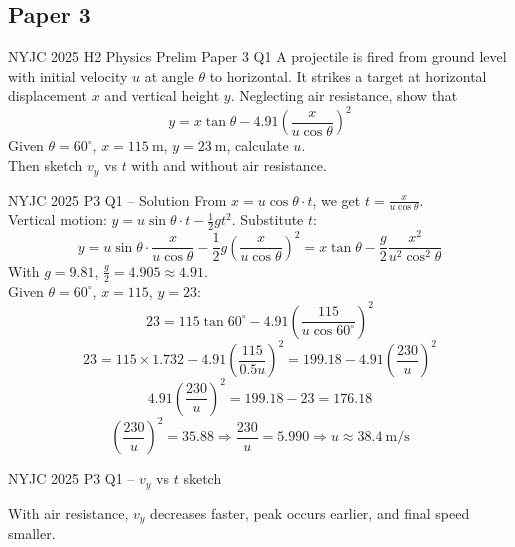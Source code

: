 \documentclass{beamer}
\begin{document}
\subsection{Paper 3}

\begin{frame}[t,shrink=15]{NYJC 2025 H2 Physics Prelim Paper 3 Q1}
A projectile is fired from ground level with initial velocity $u$ at angle $\theta$ to horizontal. It strikes a target at horizontal displacement $x$ and vertical height $y$. Neglecting air resistance, show that
\[ y = x\tan\theta - 4.91\left(\frac{x}{u\cos\theta}\right)^2 \]
Given $\theta = 60^\circ$, $x = \SI{115}{\m}$, $y = \SI{23}{\m}$, calculate $u$. \\
Then sketch $v_y$ vs $t$ with and without air resistance.
\end{frame}

\begin{frame}[shrink=15]{NYJC 2025 P3 Q1 – Solution}
From $x = u\cos\theta \cdot t$, we get $t = \frac{x}{u\cos\theta}$. \\
Vertical motion: $y = u\sin\theta \cdot t - \frac12 g t^2$. Substitute $t$:
\[ y = u\sin\theta \cdot \frac{x}{u\cos\theta} - \frac12 g \left(\frac{x}{u\cos\theta}\right)^2 = x\tan\theta - \frac{g}{2} \frac{x^2}{u^2\cos^2\theta} \]
With $g = 9.81$, $\frac{g}{2} = 4.905 \approx 4.91$. \\
Given $\theta=60^\circ$, $x=115$, $y=23$:
\[ 23 = 115\tan60^\circ - 4.91\left(\frac{115}{u\cos60^\circ}\right)^2 \]
\[ 23 = 115\times1.732 - 4.91\left(\frac{115}{0.5u}\right)^2 = 199.18 - 4.91\left(\frac{230}{u}\right)^2 \]
\[ 4.91\left(\frac{230}{u}\right)^2 = 199.18 - 23 = 176.18 \]
\[ \left(\frac{230}{u}\right)^2 = 35.88 \Rightarrow \frac{230}{u} = 5.990 \Rightarrow u \approx \SI{38.4}{\meter\per\second} \]
\end{frame}

\begin{frame}[shrink=15]{NYJC 2025 P3 Q1 – $v_y$ vs $t$ sketch}
\begin{center}
\end{center}
With air resistance, $v_y$ decreases faster, peak occurs earlier, and final speed smaller.
\end{frame}
\end{document}
